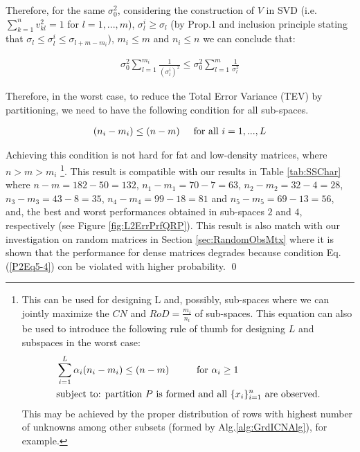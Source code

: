 Therefore, for the same $\sigma^{2}_{0}$, considering the construction of $V$ in SVD (i.e. $\sum_{k=1}^{n} v^{2}_{kl}=1$ for $l=1,...,m$), $\sigma^{i}_{l}\geq \sigma_{l}$ (by Prop.1 and inclusion principle stating that $\sigma_{l} \leq \sigma_{l}^{i} \leq \sigma_{l+m-m_{i}}$), $m_{i}\leq m$ and $n_{i}\leq n$ we can conclude that:

\begin{equation}\label{P2Eq5-3}
\begin{aligned}
\sigma^{2}_{0} \sum_{l=1}^{m_{i}} \frac{1}{\left(\sigma^{i}_{l}\right)^{2}} \leq  \sigma^{2}_{0} \sum_{l=1}^{m} \frac{1}{\sigma^{2}_{l}}
\end{aligned}
\end{equation}

Therefore, in the worst case, to reduce the Total Error Variance (TEV) by partitioning, we need to have the following condition for all sub-spaces. 

\begin{equation}\label{P2Eq5-4}
\begin{aligned}
(n_{i}-m_{i}) \leq (n-m) \hspace{0.5 cm} \text{for all $i=1,...,L$}
\end{aligned}
\end{equation}

Achieving this condition is not hard for fat and low-density matrices, where $n>m>m_{i}$ \footnote{This can be used for designing L and, possibly, sub-spaces where we can jointly maximize the $CN$ and $RoD=\frac{m_{i}}{n_{i}}$ of sub-spaces. This equation can also be used to introduce the following rule of thumb for designing $L$ and subspaces in the worst case:
\begin{equation}\label{P2Eq5-5}
\begin{aligned}
 & \sum_{i=1}^{L} \alpha_{i}(n_{i}-m_{i}) \leq (n-m) \hspace{0.5 cm} \hspace{0.5 cm} \text{for $\alpha_{i}\geq 1$} \\
 & \text{subject to: partition $P$ is formed and all $\{x_{i}\}_{i=1}^{n}$ are observed.}
\end{aligned}
\end{equation}
This may be achieved by the proper distribution of rows with highest number of unknowns among other subsets (formed by Alg.\ref{alg:GrdICNAlg}), for example.}. This result is compatible with our results in Table \ref{tab:SSChar} where $n-m=182-50=132$, $n_{1}-m_{1}=70-7=63$, $n_{2}-m_{2}=32-4=28$, $n_{3}-m_{3}=43-8=35$, $n_{4}-m_{4}=99-18=81$ and $n_{5}-m_{5}=69-13=56$, and, the best and worst performances obtained in sub-spaces $2$ and $4$, respectively (see Figure \ref{fig:L2ErrPrfQRP}). This result is also match with our investigation on random matrices in Section \ref{sec:RandomObsMtx} where it is shown that the performance for dense matrices degrades because condition Eq.(\ref{P2Eq5-4}) con be violated with higher probability. \qed \\

